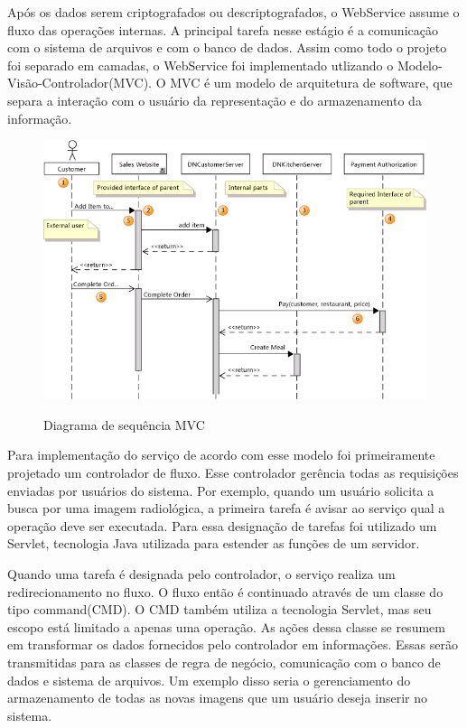 Após os dados serem criptografados ou descriptografados, o WebService assume o fluxo das operações internas.
A principal tarefa nesse estágio é a comunicação com o sistema de arquivos e com o banco de dados.
Assim como todo o projeto foi separado em camadas, o WebService foi implementado utlizando o Modelo-Visão-Controlador(MVC).
O MVC é um modelo de arquitetura de software, que separa a interação com o usuário da representação e do armazenamento da informação.

\begin{figure}[ht]
	\centering	
	\caption[\hspace{0.1cm}Diagrama de Sequência.]{Diagrama de sequência MVC}
	\vspace{-0.4cm}
	\includegraphics[width=.8\textwidth]{figuras/sequencia.png}
	\vspace{-0.2cm}
	\label{fig:figura2}
\end{figure}

Para implementação do serviço de acordo com esse modelo foi primeiramente projetado um controlador de fluxo.
Esse controlador gerência todas as requisições enviadas por usuários do sistema.
Por exemplo, quando um usuário solicita a busca por uma imagem radiológica, a primeira tarefa é avisar ao serviço qual a operação deve ser executada.
Para essa designação de tarefas foi utilizado um Servlet, tecnologia Java utilizada para estender as funções de um servidor.

Quando uma tarefa é designada pelo controlador, o serviço realiza um redirecionamento no fluxo.
O fluxo então é continuado através de um classe do tipo command(CMD).
O CMD também utiliza a tecnologia Servlet, mas seu escopo está limitado a apenas uma operação.
As ações dessa classe se resumem em transformar os dados fornecidos pelo controlador em informações.
Essas serão transmitidas para as classes de regra de negócio, comunicação com o banco de dados e sistema de arquivos.
Um exemplo disso seria o gerenciamento do armazenamento de todas as novas imagens que um usuário deseja inserir no sistema.

